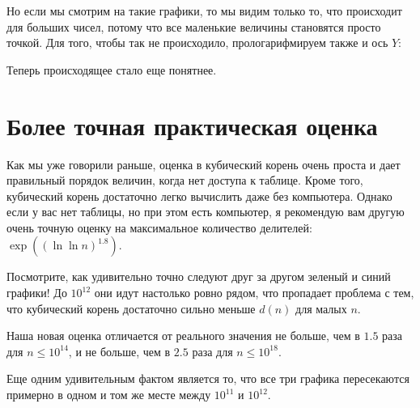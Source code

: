 Но если мы смотрим на такие графики, то мы видим только то, что происходит для больших чисел, потому что все маленькие величины становятся просто точкой. Для того, чтобы так не происходило, прологарифмируем также и ось $Y$:

\begin{center}    

\end{center}

Теперь происходящее стало еще понятнее.

\section{Более точная практическая оценка}

Как мы уже говорили раньше, оценка в кубический корень очень проста и дает правильный порядок величин, когда нет доступа к таблице. Кроме того, кубический корень достаточно легко вычислить даже без компьютера. Однако если у вас нет таблицы, но при этом есть компьютер, я рекомендую вам другую очень точную оценку на максимальное количество делителей: $\exp((\ln \ln n)^{1.8})$.

\begin{center}    

\end{center}

Посмотрите, как удивительно точно следуют друг за другом зеленый и синий графики! До $10^{12}$ они идут настолько ровно рядом, что пропадает проблема с тем, что кубический корень достаточно сильно меньше $d(n)$ для малых $n$.

Наша новая оценка отличается от реального значения не больше, чем в $1.5$ раза для $n \le 10^{14}$, и не больше, чем в $2.5$ раза для $n \le 10^{18}$.

Еще одним удивительным фактом является то, что все три графика пересекаются примерно в одном и том же месте между $10^{11}$ и $10^{12}$.
